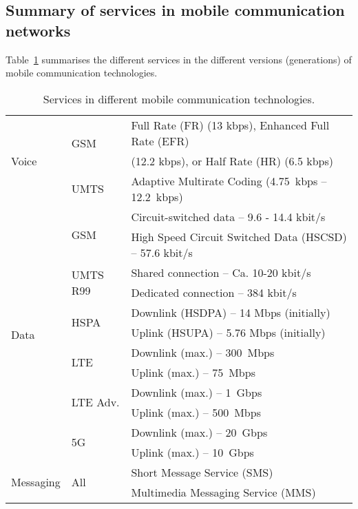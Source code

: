 \subsection{Summary of services in mobile communication networks}
Table~\ref{tbl:mobileservices} summarises the different services in the different versions (generations) of mobile communication technologies.
\begin{table}[htbp]
\centering
\begin{tabular}{|l|l|l|}\hline
\multirow{3}{*}{Voice} & \multirow{2}{*}{GSM} & Full Rate (FR) (13 kbps), Enhanced Full Rate (EFR)\\ 
 & & (12.2 kbps), or Half Rate (HR) (6.5 kbps) \\ \cline{2-3}
 & UMTS & Adaptive Multirate Coding (4.75~kbps -- 12.2~kbps)\\ \hline
\multirow{12}{*}{Data} & \multirow{2}{*}{GSM} & Circuit-switched data -- 9.6 - 14.4 kbit/s \\
 & & High Speed Circuit Switched Data (HSCSD) -- 57.6 kbit/s \\ \cline{2-3}
 & \multirow{2}{*}{UMTS R99} & Shared connection -- Ca. 10-20 kbit/s \\
 & & Dedicated connection -- 384 kbit/s \\ \cline{2-3}
 & \multirow{2}{*}{HSPA} & Downlink (HSDPA) -- 14 Mbps (initially) \\
 & & Uplink (HSUPA) -- 5.76 Mbps (initially) \\ \cline{2-3}
 & \multirow{2}{*}{LTE} & Downlink (max.) -- 300~Mbps \\
 & & Uplink (max.) -- 75~Mbps \\ \cline{2-3}
 & \multirow{2}{*}{LTE Adv.} & Downlink (max.) -- 1~Gbps \\
 & & Uplink (max.) -- 500~Mbps \\ \cline{2-3}
 & \multirow{2}{*}{5G} & Downlink (max.) -- 20~Gbps \\
 & & Uplink (max.) -- 10~Gbps \\ \hline
 \multirow{2}{*}{Messaging} & \multirow{2}{*}{All} & Short Message Service (SMS) \\
 & & Multimedia Messaging Service (MMS) \\ \hline
\end{tabular}
\caption{\label{tbl:mobileservices}Services in different mobile communication technologies.}
\end{table}

